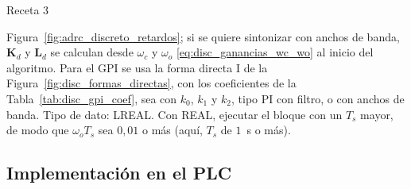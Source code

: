 \begin{recuadro}{Receta 3}
\begin{enumerate}
  Figura~\ref{fig:adrc_discreto_retardos}; si se quiere sintonizar con anchos de banda,
  $\mathbf{K}_d$ y $\mathbf{L}_d$ se calculan desde $\omega_c$ y $\omega_o$
  \eqref{eq:disc_ganancias_wc_wo} al inicio del algoritmo. Para el GPI se usa la forma directa I de la
  Figura~\ref{fig:disc_formas_directas}, con los coeficientes de la Tabla~\ref{tab:disc_gpi_coef}, sea
  con $k_0$, $k_1$ y $k_2$, tipo PI con filtro, o con anchos de banda. Tipo de dato: LREAL. Con REAL,
  ejecutar el bloque con un $T_s$ mayor, de modo que $\omega_o T_s$ sea $0{,}01$ o más (aquí, $T_s$ de
  $1$~s o más).
\end{enumerate}
\end{recuadro}

\subsection{Implementación en el PLC}

